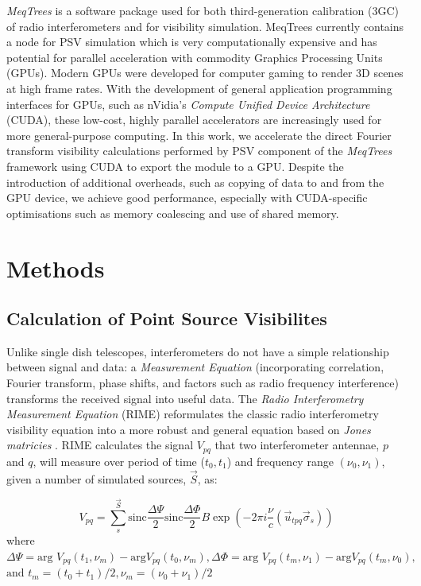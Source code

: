 \emph{MeqTrees} is a software package used for both third-generation calibration (3GC) of radio interferometers and for  visibility simulation. MeqTrees currently contains a node for PSV simulation which is very computationally expensive and has potential for parallel acceleration with commodity Graphics Processing Units (GPUs). \label{sec:cuda}  Modern GPUs were developed for computer gaming to render 3D scenes at high frame rates. With the development of general application programming interfaces for GPUs, such as nVidia's \emph{Compute Unified Device Architecture} (CUDA), these low-cost, highly parallel accelerators are increasingly used for more general-purpose computing. In this work, we accelerate the direct Fourier transform visibility calculations performed by PSV component of the \emph{MeqTrees} framework using CUDA to export the module to a GPU.  Despite the introduction of additional overheads, such as copying of data to and from the GPU device, we achieve good performance, especially with CUDA-specific optimisations such as memory coalescing and use of shared memory.


\section{Methods}
\subsection{Calculation of Point Source Visibilites}
\label{sec:meqtrees}

Unlike single dish telescopes, interferometers do not have a simple relationship between signal and data: a \emph{Measurement Equation} (incorporating correlation, Fourier transform, phase shifts, and factors such as radio frequency interference) transforms the received signal into useful data. The \emph{Radio Interferometry Measurement Equation} (RIME) reformulates the classic radio interferometry visibility equation into a more robust and general equation based on \emph{Jones matricies} \citep{Smirnov2011}. RIME calculates the signal $V_{pq}$ that two interferometer antennae, $p$ and $q$, will measure over period of time ($t_0, t_1$)  and  frequency range $(\nu_0, \nu_1)$, given a number of simulated sources, $\vec{S}$, as:

\begin{equation}
V_{pq} = \sum_s^{\vec{S}}
\mbox{sinc}\frac{\Delta\Psi}{2}\mbox{sinc}\frac{\Delta\Phi}{2}
B\exp\left({-2\pi i\frac{\nu}{c}(\vec{u}_{tpq}\vec\sigma_s)}\right)
\label{eq:RIME}
\end{equation}
where
$\Delta\Psi = \mbox{arg }V_{pq}(t_1,\nu_m) - \mbox{arg
}V_{pq}(t_0,\nu_m), 
\Delta\Phi = \mbox{arg }V_{pq}(t_m,\nu_1) - \mbox{arg
}V_{pq}(t_m,\nu_0),$
$\mbox{and } t_m = (t_0 + t_1)/2, \nu_m = (\nu_0 + \nu_1)/2 $


